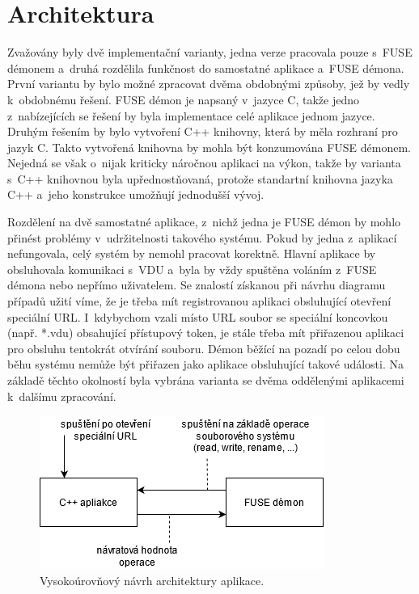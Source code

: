 \section{Architektura}

Zvažovány byly dvě implementační varianty, jedna verze pracovala pouze s FUSE démonem a druhá rozdělila funkčnost do samostatné aplikace a FUSE démona. První variantu by
bylo možné zpracovat dvěma obdobnými způsoby, jež by vedly k obdobnému řešení. FUSE démon je napsaný v jazyce C, takže jedno z nabízejících se řešení by byla implementace
celé aplikace jednom jazyce. Druhým řešením by bylo vytvoření C++ knihovny, která by měla rozhraní pro jazyk C. Takto vytvořená knihovna by mohla být konzumována FUSE démonem.
Nejedná se však o nijak kriticky náročnou aplikaci na výkon, takže by varianta s C++ knihovnou byla upřednostňovaná, protože standartní knihovna jazyka C++ a jeho konstrukce 
umožňují jednodušší vývoj.

Rozdělení na dvě samostatné aplikace, z nichž jedna je FUSE démon by mohlo přinést problémy v udržitelnosti takového systému. Pokud by jedna z aplikací nefungovala, celý systém
by nemohl pracovat korektně. Hlavní aplikace by obsluhovala komunikaci s VDU a byla by vždy spuštěna voláním z FUSE démona nebo nepřímo uživatelem. Se znalostí 
získanou při návrhu diagramu případů užití víme, že je třeba mít registrovanou aplikaci obsluhující otevření speciální URL. I kdybychom vzali místo URL soubor se speciální
koncovkou (např. *.vdu) obsahující přístupový token, je stále třeba mít přiřazenou aplikaci pro obsluhu tentokrát otvírání souboru. Démon běžící na pozadí po celou dobu běhu
systému nemůže být přiřazen jako aplikace obsluhující takové události. Na základě těchto okolností byla vybrána varianta se dvěma oddělenými aplikacemi k dalšímu zpracování.

\begin{figure}[h]
    \centering
    \includegraphics[width=0.55\linewidth]{other-fig/architecture.png}
    \caption{Vysokoúrovňový návrh architektury aplikace.}
\end{figure}

